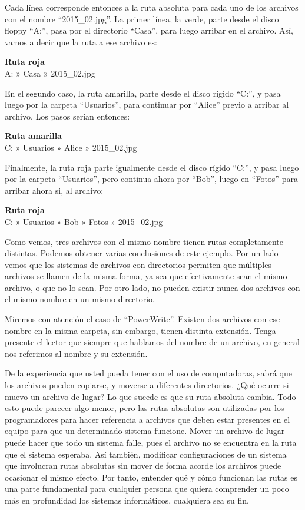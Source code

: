 Cada línea corresponde entonces a la ruta absoluta para cada uno de los archivos
con el nombre ``2015\_02.jpg''. La primer línea, la verde, parte desde el disco
floppy ``A:'', pasa por el directorio ``Casa'', para luego arribar en el archivo.
Así, vamos a decir que la ruta a ese archivo es:

\begin{example}
    \textbf{Ruta roja}\\
    A: » Casa » 2015\_02.jpg
\end{example}

En el segundo caso, la ruta amarilla, parte desde el disco rígido ``C:'', y pasa
luego por la carpeta ``Usuarios'', para continuar por ``Alice'' previo a arribar
al archivo. Los pasos serían entonces:

\begin{example}
    \textbf{Ruta amarilla}\\
    C: » Usuarios » Alice » 2015\_02.jpg
\end{example}

Finalmente, la ruta roja parte igualmente desde el disco rígido ``C:'', y pasa
luego por la carpeta ``Usuarios'', pero continua ahora por ``Bob'', luego en
``Fotos'' para arribar ahora si, al archivo:

\begin{example}
    \textbf{Ruta roja}\\
    C: » Usuarios » Bob » Fotos » 2015\_02.jpg
\end{example}

Como vemos, tres archivos con el mismo nombre tienen rutas completamente distintas.
Podemos obtener varias conclusiones de este ejemplo. Por un lado vemos que los
sistemas de archivos con directorios permiten que múltiples archivos se llamen
de la misma forma, ya sea que efectivamente sean el mismo archivo, o que no lo sean.
Por otro lado, no pueden existir nunca dos archivos con el mismo nombre en un
mismo directorio.

Miremos con atención el caso de ``PowerWrite''. Existen dos archivos con ese
nombre en la misma carpeta, sin embargo, tienen distinta extensión. Tenga presente
el lector que siempre que hablamos del nombre de un archivo, en general nos
referimos al nombre y su extensión.

De la experiencia que usted pueda tener con el uso de computadoras, sabrá que
los archivos pueden copiarse, y moverse a diferentes directorios. ¿Qué ocurre
si muevo un archivo de lugar? Lo que sucede es que su ruta absoluta cambia.
Todo esto puede parecer algo menor, pero las rutas absolutas son utilizadas
por los programadores para hacer referencia a archivos que deben estar presentes
en el equipo para que un determinado sistema funcione. Mover un archivo de lugar
puede hacer que todo un sistema falle, pues el archivo no se encuentra en la ruta
que el sistema esperaba. Así también, modificar configuraciones de un sistema que
involucran rutas absolutas sin mover de forma acorde los archivos puede ocasionar
el mismo efecto. Por tanto, entender qué y cómo funcionan las rutas es una parte
fundamental para cualquier persona que quiera comprender un poco más en profundidad
los sistemas informáticos, cualquiera sea su fin.

